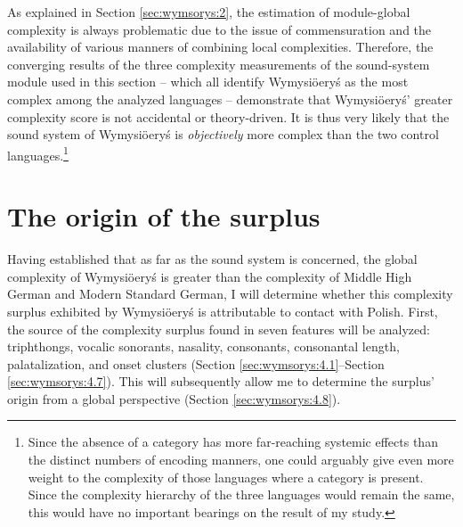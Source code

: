 \documentclass[output=paper,hidelinks]{langscibook}
\begin{document}
As explained in Section \ref{sec:wymsorys:2}, the estimation of module-global complexity is always problematic due to the issue of commensuration and the availability of various manners of combining local complexities. Therefore, the converging results of the three complexity measurements of the sound-system module used in this section – which all identify Wymysiöeryś as the most complex among the analyzed languages – demonstrate that Wymysiöeryś' greater complexity score is not accidental or theory-driven. It is thus very likely that the sound system of Wymysiöeryś is \textit{objectively} more complex than the two control languages.\footnote{Since the absence of a category has more far-reaching systemic effects than the distinct numbers of encoding manners, one could arguably give even more weight to the complexity of those languages where a category is present. Since the complexity hierarchy of the three languages would remain the same, this would have no important bearings on the result of my study.}

\section{The origin of the surplus} %
\label{sec:wymsorys:4}
Having established that as far as the sound system is concerned, the global complexity of Wymysiöeryś is greater than the complexity of Middle High German and Modern Standard German, I will determine whether this complexity surplus exhibited by Wymysiöeryś is attributable to contact with Polish. First, the source of the complexity surplus found in seven features will be analyzed: triphthongs, vocalic sonorants, nasality, consonants, consonantal length, palatalization, and onset clusters (Section \ref{sec:wymsorys:4.1}--Section \ref{sec:wymsorys:4.7}). This will subsequently allow me to determine the surplus' origin from a global perspective (Section \ref{sec:wymsorys:4.8}).
\end{document}

